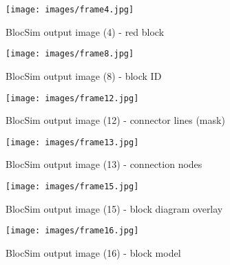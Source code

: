 \begin{figure}[ht!]
\centering
\texttt{[image: images/frame4.jpg]}
\caption{BlocSim output image (4) - red block \cite{blocsim2014}}
\label{im:frame4}
\end{figure}

\begin{figure}[ht!]
\centering
\texttt{[image: images/frame8.jpg]}
\caption{BlocSim output image (8) - block ID \cite{blocsim2014}}
\label{im:frame8}
\end{figure}

\begin{figure}[ht!]
\centering
\texttt{[image: images/frame12.jpg]}
\caption{BlocSim output image (12) - connector lines (mask) \cite{blocsim2014}}
\label{im:frame12}
\end{figure}

\begin{figure}[ht!]
\centering
\texttt{[image: images/frame13.jpg]}
\caption{BlocSim output image (13) - connection nodes \cite{blocsim2014}}
\label{im:frame13}
\end{figure}

\begin{figure}[ht!]
\centering
\texttt{[image: images/frame15.jpg]}
\caption{BlocSim output image (15) - block diagram overlay \cite{blocsim2014}}
\label{im:frame15}
\end{figure}

\begin{figure}[ht!]
\centering
\texttt{[image: images/frame16.jpg]}
\caption{BlocSim output image (16) - block model \cite{blocsim2014}}
\label{im:frame16}
\end{figure}

\clearpage




\begin{comment}

For more information regarding the ... of BlocSim, see the online materials outlined in Appendix \ref{ch:appendix}.

\begin{table}[ht]
	\center
	\begin{tabular}{$r^l^l} %
		\hline
		\rowstyle{\bfseries}
		H1 & H2 & H3 \\
		\hline
		Right & \gtick & \rcross \\
		A & B & C \\
		\hline
	\end{tabular}
	\caption{Dummy Table \cite{dummy:2012}}
	\label{tab:dummytable}
\end{table} 


\begin{itemize}
\item 
\end{itemize}


\end{comment}
